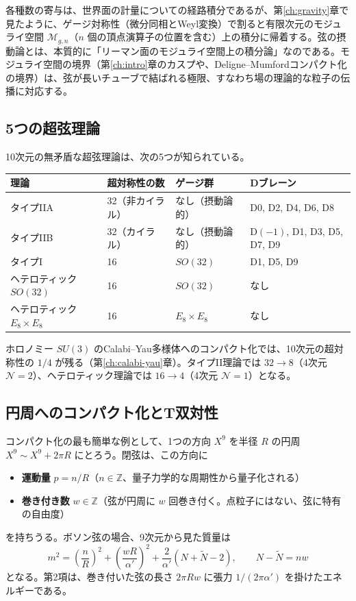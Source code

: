 \documentclass[uplatex, dvipdfmx, book]{jsbook}
\let\origsubsection\subsection
\let\origsubsubsection\subsubsection
\renewcommand{\section}{\origsubsection}
\renewcommand{\subsection}{\origsubsubsection}
\renewcommand{\subsubsection}{\paragraph}
\begin{document}
各種数の寄与は、世界面の計量についての経路積分であるが、第\ref{ch:gravity}章で見たように、ゲージ対称性（微分同相とWeyl変換）で割ると有限次元のモジュライ空間 $\mathcal{M}_{g,n}$（$n$ 個の頂点演算子の位置を含む）上の積分に帰着する。弦の摂動論とは、本質的に「リーマン面のモジュライ空間上の積分論」なのである。モジュライ空間の境界（第\ref{ch:intro}章のカスプや、Deligne--Mumfordコンパクト化の境界）は、弦が長いチューブで結ばれる極限、すなわち場の理論的な粒子の伝播に対応する。

\section{5つの超弦理論}

10次元の無矛盾な超弦理論は、次の5つが知られている。

\begin{center}\small\setlength{\tabcolsep}{4pt}
\begin{tabular}{llll}
    \hline
    理論 & 超対称性の数 & ゲージ群 & Dブレーン \\
    \hline
    タイプIIA & 32（非カイラル） & なし（摂動論的） & D0, D2, D4, D6, D8 \\
    タイプIIB & 32（カイラル） & なし（摂動論的） & D$(-1)$, D1, D3, D5, D7, D9 \\
    タイプI & 16 & $SO(32)$ & D1, D5, D9 \\
    ヘテロティック $SO(32)$ & 16 & $SO(32)$ & なし \\
    ヘテロティック $E_8 \times E_8$ & 16 & $E_8 \times E_8$ & なし \\
    \hline
\end{tabular}
\end{center}

ホロノミー $SU(3)$ のCalabi--Yau多様体へのコンパクト化では、10次元の超対称性の $1/4$ が残る（第\ref{ch:calabi-yau}章）。タイプII理論では $32 \to 8$（4次元 $\mathcal{N} = 2$）、ヘテロティック理論では $16 \to 4$（4次元 $\mathcal{N} = 1$）となる。

\section{円周へのコンパクト化とT双対性}

コンパクト化の最も簡単な例として、1つの方向 $X^{9}$ を半径 $R$ の円周 $X^9 \sim X^9 + 2\pi R$ にとろう。閉弦は、この方向に
\begin{itemize}
    \item \textbf{運動量} $p = n/R$（$n \in \mathbb{Z}$、量子力学的な周期性から量子化される）
    \item \textbf{巻き付き数} $w \in \mathbb{Z}$（弦が円周に $w$ 回巻き付く。点粒子にはない、弦に特有の自由度）
\end{itemize}
を持ちうる。ボソン弦の場合、9次元から見た質量は
\begin{equation}
    m^2 = \left( \frac{n}{R} \right)^2 + \left( \frac{wR}{\alpha'} \right)^2 + \frac{2}{\alpha'}\left( N + \tilde{N} - 2 \right), \qquad N - \tilde{N} = nw
\end{equation}
となる。第2項は、巻き付いた弦の長さ $2\pi R w$ に張力 $1/(2\pi\alpha')$ を掛けたエネルギーである。
\end{document}
